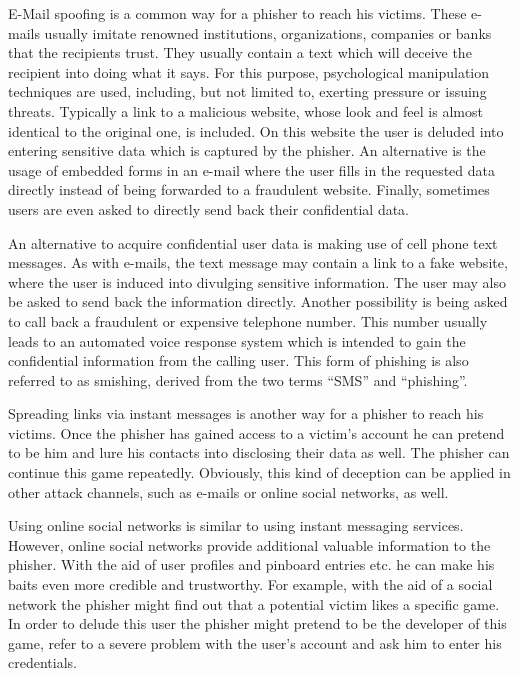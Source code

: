 \label{s:attack_channels}
\begin{description}[leftmargin=0cm]
	\item[E-Mail:] E-Mail spoofing is a common way for a phisher to reach his victims.
 These e-mails usually imitate renowned institutions, organizations, companies or banks that the recipients trust.
 They usually contain a text which will deceive the recipient into doing what it says. 
For this purpose, psychological manipulation techniques are used, including, but not limited to, exerting pressure or issuing threats.
 Typically a link to a malicious website, whose look and feel is almost identical to the original one, is included.
 On this website the user is deluded into entering sensitive data which is captured by the phisher.
 An alternative is the usage of embedded forms in an e-mail where the user fills in the requested data directly instead of being forwarded to a fraudulent website.
 Finally, sometimes users are even asked to directly send back their confidential data.

	\item[SMS:] An alternative to acquire confidential user data is making use of cell phone text messages.
 As with e-mails, the text message may contain a link to a fake website, where the user is induced into divulging sensitive information.
 The user may also be asked to send back the information directly.
 Another possibility is being asked to call back a fraudulent or expensive telephone number.
 This number usually leads to an automated voice response system which is intended to gain the confidential information from the calling user.
 This form of phishing is also referred to as smishing, derived from the two terms ``SMS'' and ``phishing''.

	\item[Instant Messaging:] Spreading links via instant messages is another way for a phisher to reach his victims. Once the phisher has gained access to a victim's account he can pretend to be him and lure his contacts into disclosing their data as well. The phisher can continue this game repeatedly.
Obviously, this kind of deception can be applied in other attack channels, such as e-mails or online social networks, as well.
 
	\item[Online Social Networks:] Using online social networks is similar to using instant messaging services.
 However, online social networks provide additional valuable information to the phisher.
 With the aid of user profiles and pinboard entries etc. he can make his baits even more credible and trustworthy. 
For example, with the aid of a social network the phisher might find out that a potential victim likes a specific game. In order to delude this user the phisher might pretend to be the developer of this  game, refer to a severe problem with the user's account and ask him to enter his credentials.


\end{description}
